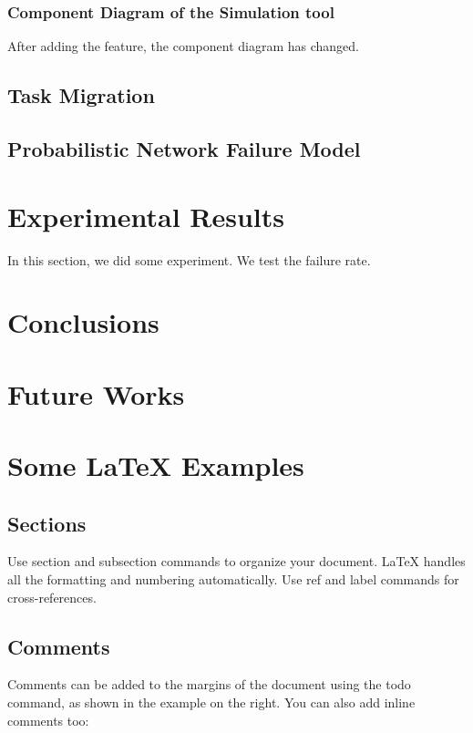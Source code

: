 \subsubsection{Component Diagram of the Simulation tool}
After adding the feature, the component diagram has changed.

\subsection{Task Migration}

\subsection{Probabilistic Network Failure Model}

\section{Experimental Results}
In this section, we did some experiment. We test the failure rate.

\section{Conclusions}


\section{Future Works}

\section{Some \LaTeX{} Examples}
\label{sec:examples}

\subsection{Sections}

Use section and subsection commands to organize your document. \LaTeX{} handles all the formatting and numbering automatically. Use ref and label commands for cross-references.

\subsection{Comments}

Comments can be added to the margins of the document using the  todo command, as shown in the example on the right. You can also add inline comments too:

